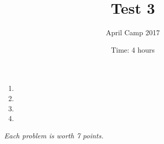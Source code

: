\documentclass[a4paper,12pt]{article}
\title{Test 3}
\date{Time: 4 hours}
\author{April Camp 2017}
\begin{document}
 \maketitle

\begin{enumerate}
	\item 
	
	

	\item 
	
	

	\item 
	
	

	\item 
	
	

\end{enumerate}

\medskip 

\hfill \emph{Each problem is worth 7 points.}
	
\end{document}
